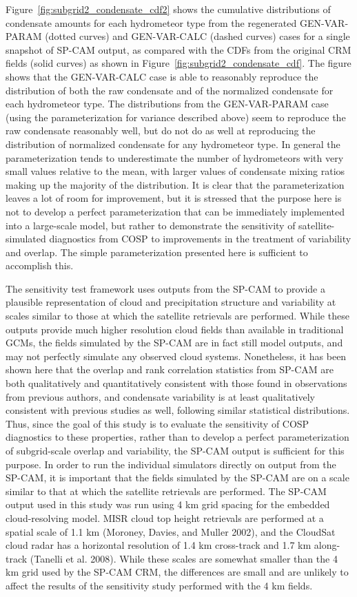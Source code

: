 Figure~\ref{fig:subgrid2_condensate_cdf2} shows the cumulative
distributions of condensate amounts for each hydrometeor type from the
regenerated GEN-VAR-PARAM (dotted curves) and GEN-VAR-CALC (dashed
curves) cases for a single snapshot of SP-CAM output, as compared with
the CDFs from the original CRM fields (solid curves) as shown in
Figure~\ref{fig:subgrid2_condensate_cdf}. The figure shows that the
GEN-VAR-CALC case is able to reasonably reproduce the distribution of
both the raw condensate and of the normalized condensate for each
hydrometeor type. The distributions from the GEN-VAR-PARAM case (using
the parameterization for variance described above) seem to reproduce the
raw condensate reasonably well, but do not do as well at reproducing the
distribution of normalized condensate for any hydrometeor type. In
general the parameterization tends to underestimate the number of
hydrometeors with very small values relative to the mean, with larger
values of condensate mixing ratios making up the majority of the
distribution. It is clear that the parameterization leaves a lot of room
for improvement, but it is stressed that the purpose here is not to
develop a perfect parameterization that can be immediately implemented
into a large-scale model, but rather to demonstrate the sensitivity of
satellite-simulated diagnostics from COSP to improvements in the
treatment of variability and overlap. The simple parameterization
presented here is sufficient to accomplish this.

The sensitivity test framework uses outputs from the SP-CAM to provide a
plausible representation of cloud and precipitation structure and
variability at scales similar to those at which the satellite retrievals
are performed. While these outputs provide much higher resolution cloud
fields than available in traditional GCMs, the fields simulated by the
SP-CAM are in fact still model outputs, and may not perfectly simulate
any observed cloud systems. Nonetheless, it has been shown here that the
overlap and rank correlation statistics from SP-CAM are both
qualitatively and quantitatively consistent with those found in
observations from previous authors, and condensate variability is at
least qualitatively consistent with previous studies as well, following
similar statistical distributions. Thus, since the goal of this study is
to evaluate the sensitivity of COSP diagnostics to these properties,
rather than to develop a perfect parameterization of subgrid-scale
overlap and variability, the SP-CAM output is sufficient for this
purpose. In order to run the individual simulators directly on output
from the SP-CAM, it is important that the fields simulated by the SP-CAM
are on a scale similar to that at which the satellite retrievals are
performed. The SP-CAM output used in this study was run using 4 km grid
spacing for the embedded cloud-resolving model. MISR cloud top height
retrievals are performed at a spatial scale of 1.1 km (Moroney, Davies,
and Muller 2002), and the CloudSat cloud radar has a horizontal
resolution of 1.4 km cross-track and 1.7 km along-track (Tanelli et al.
2008). While these scales are somewhat smaller than the 4 km grid used
by the SP-CAM CRM, the differences are small and are unlikely to affect
the results of the sensitivity study performed with the 4 km fields.

